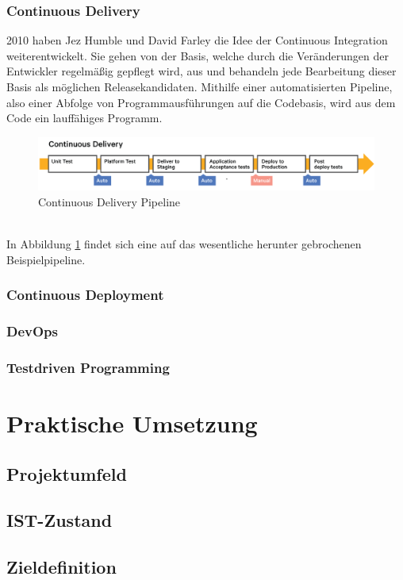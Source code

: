 \subsection{Continuous Delivery}
2010 haben Jez Humble und David Farley\autocite{Farley.2010} die Idee der Continuous Integration weiterentwickelt. Sie gehen von der Basis, welche durch die Veränderungen der Entwickler regelmäßig gepflegt wird, aus und behandeln jede Bearbeitung dieser Basis als möglichen Releasekandidaten.\autocite[Vgl.][S.5]{Stahl.2018} Mithilfe einer automatisierten Pipeline, also einer Abfolge von Programmausführungen auf die Codebasis, wird aus dem Code ein lauffähiges Programm.
\begin{figure}[h!]
	\centering
	\includegraphics[scale = 0.3]{img/CDE.png}
	\caption{Continuous Delivery Pipeline}
	\label{img:cde}
\end{figure}\\
In Abbildung \ref{img:cde} findet sich eine auf das wesentliche herunter gebrochenen Beispielpipeline. 
\subsection{Continuous Deployment}
\subsection{DevOps}
\subsection{Testdriven Programming}  
\chapter{Praktische Umsetzung}
\section{Projektumfeld}
\section{IST-Zustand}
\section{Zieldefinition}
